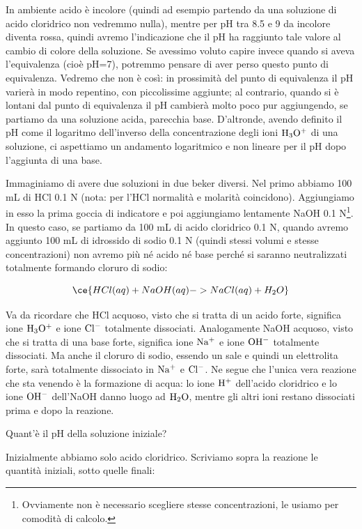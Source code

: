In ambiente acido è incolore (quindi ad esempio partendo da una soluzione di acido cloridrico non vedremmo nulla), mentre per pH tra 8.5 e 9 da incolore diventa rossa, quindi avremo l'indicazione che il pH ha raggiunto tale valore al cambio di colore della soluzione. Se avessimo voluto capire invece quando si aveva l'equivalenza (cioè pH=7), potremmo pensare di aver perso questo punto di equivalenza. Vedremo che non è così: in prossimità del punto di equivalenza il pH varierà in modo repentino, con piccolissime aggiunte; al contrario, quando si è lontani dal punto di equivalenza il pH cambierà molto poco pur aggiungendo, se partiamo da una soluzione acida, parecchia base. D'altronde, avendo definito il pH come il logaritmo dell'inverso della concentrazione degli ioni $\rm H_3O^+$ di una soluzione, ci aspettiamo un andamento logaritmico e non lineare per il pH dopo l'aggiunta di una base.

\vspace{0.2cm}Immaginiamo di avere due soluzioni in due beker diversi. Nel primo abbiamo 100 mL di HCl 0.1 N (nota: per l'HCl normalità e molarità coincidono). Aggiungiamo in esso la prima goccia di indicatore e poi aggiungiamo lentamente NaOH 0.1 N\footnote{Ovviamente non è necessario scegliere stesse concentrazioni, le usiamo per comodità di calcolo.}. In questo caso, se partiamo da 100 mL di acido cloridrico 0.1 N, quando avremo aggiunto 100 mL di idrossido di sodio 0.1 N (quindi stessi volumi e stesse concentrazioni) non avremo più né acido né base perché si saranno neutralizzati totalmente formando cloruro di sodio:

$$\ce{HCl(aq) + NaOH(aq) -> NaCl(aq) + H_2O}$$

Va da ricordare che HCl acquoso, visto che si tratta di un acido forte, significa ione $\rm H_3O^+$ e ione $\rm Cl^-$ totalmente dissociati. Analogamente NaOH acquoso, visto che si tratta di una base forte, significa ione $\rm Na^+$ e ione $\rm OH^-$ totalmente dissociati. Ma anche il cloruro di sodio, essendo un sale e quindi un elettrolita forte, sarà totalmente dissociato in $\rm Na^+$ e $\rm Cl^-$. Ne segue che l'unica vera reazione che sta venendo è la formazione di acqua: lo ione $\rm H^+$ dell'acido cloridrico e lo ione $\rm OH^-$ dell'NaOH danno luogo ad $\rm H_2O$, mentre gli altri ioni restano dissociati prima e dopo la reazione.

Quant'è il pH della soluzione iniziale?

Inizialmente abbiamo solo acido cloridrico. Scriviamo sopra la reazione le quantità iniziali, sotto quelle finali:

